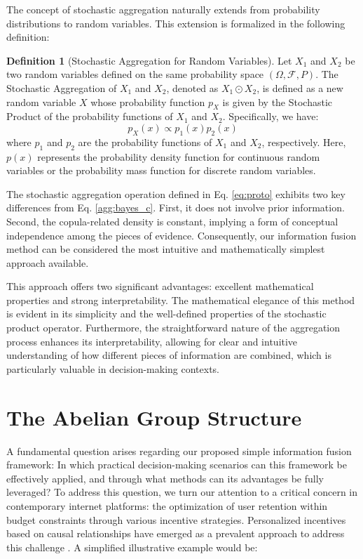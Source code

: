 \documentclass[letterpaper]{article} %
\theoremstyle{definition}
\newtheorem{definition}[theorem]{Definition}
\theoremstyle{remark}
\begin{document}
The concept of stochastic aggregation naturally extends from probability distributions to random variables. This extension is formalized in the following definition:
\begin{definition}[Stochastic Aggregation for Random Variables]
\label{def:agg_rv}
Let $X_1$ and $X_2$ be two random variables defined on the same probability space $(\Omega, \mathcal{F}, P)$. The Stochastic Aggregation of $X_1$ and $X_2$, denoted as $X_1 \odot X_2$, is defined as a new random variable $X$ whose probability function $p_X$ is given by the Stochastic Product of the probability functions of $X_1$ and $X_2$. Specifically, we have:
\begin{equation}
\label{eq:proto}
p_X(x) \propto p_1(x)p_2(x)
\end{equation}
where $p_1$ and $p_2$ are the probability functions of $X_1$ and $X_2$, respectively. Here, $p(x)$ represents the probability density function for continuous random variables or the probability mass function for discrete random variables.
\end{definition}

The stochastic aggregation operation defined in Eq. \eqref{eq:proto} exhibits two key differences from Eq. \eqref{agg:bayes_c}. First, it does not involve prior information. Second, the copula-related density is constant, implying a form of conceptual independence among the pieces of evidence. Consequently, our information fusion method can be considered the most intuitive and mathematically simplest approach available. 


This approach offers two significant advantages: excellent mathematical properties and strong interpretability. The mathematical elegance of this method is evident in its simplicity and the well-defined properties of the stochastic product operator. Furthermore, the straightforward nature of the aggregation process enhances its interpretability, allowing for clear and intuitive understanding of how different pieces of information are combined, which is particularly valuable in decision-making contexts. 


\section{The Abelian Group Structure}
A fundamental question arises regarding our proposed simple information fusion framework: In which practical decision-making scenarios can this framework be effectively applied, and through what methods can its advantages be fully leveraged?
To address this question, we turn our attention to a critical concern in contemporary internet platforms: the optimization of user retention within budget constraints through various incentive strategies. Personalized incentives based on causal relationships have emerged as a prevalent approach to address this challenge \cite{ai2022lbcf}.  A simplified illustrative example would be:
\end{document}
